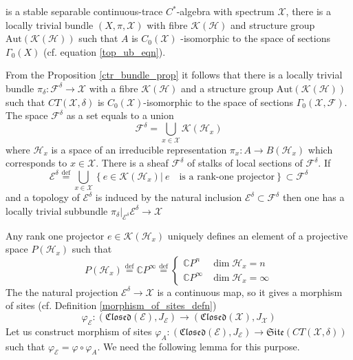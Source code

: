 \documentclass{beamer}
\theoremstyle{plain}
\newcommand{\Ga}{\Gamma}
\newcommand{\C}{\mathbb{C}}
\newcommand{\dl}{\delta}
\newcommand{\Aut}{\mathrm{Aut}}
\newcommand{\K}{\mathcal{K}}
\newcommand{\F}{\mathcal{F}}
\newcommand{\E}{\mathcal{E}}
\newcommand{\sH}{\mathcal{H}}       %
\newcommand{\sX}{\mathcal{X}}       %
\newcommand{\bydef}{\stackrel{\mathrm{def}}{=}}
\begin{document}
\begin{frame}
\begin{lemma}\label{ctr_bundle_prop}\cite{rae:ctr_morita}
	is a stable separable continuous-trace $C^*$-algebra with spectrum $\sX$, there is a locally
	trivial bundle $\left( X, \pi,\sX\right) $ with fibre $\K(\sH)$ and structure group $\Aut \left( \K(\sH)\right)$ such that $A$ is $C_0\left( \sX\right)$ -isomorphic to the space of sections $\Ga_0\left(X \right)$ (cf. equation \eqref{top_ub_eqn}).
	\end{lemma}
		From the Proposition \ref{ctr_bundle_prop}
	it follows that  there is a locally
	trivial bundle $\pi_\dl: \F^\dl\to \sX$ with a fibre $\K(\sH)$ and a structure group $\Aut \left( \K(\sH)\right)$ such that $CT\left(\sX, \dl \right)$ is $C_0\left( \sX\right)$-isomorphic to the space of sections $\Ga_0\left(\sX, \F \right)$. The space $\F^\dl$ as a set equals to a union 
	$$
	\F^\dl = \bigcup_{x\in\sX}\K\left(\sH_x \right) 
	$$
	where $\sH_x$ is a space of an irreducible representation $\pi_x: A \to B\left(\sH_x\right)$ which corresponds to $x \in \sX$. There is a sheaf $\mathscr F^\dl$ of stalks of local sections of $\F^\dl$.
	If
	$$
	\E^\dl  \bydef \bigcup_{x\in\sX} \left\{e \in \K\left(\sH_x \right)| ~ e\quad\text{is a rank-one projector}\right\}\subset \F^\dl
	$$
	and a topology of $\E^\dl$ is induced by the natural inclusion $\E^\dl\subset \F^\dl$ then one has a locally trivial subbundle $\pi_\dl|_{\E^\dl} \E^\dl\to  \sX$
\end{frame}
\begin{frame}
Any rank one projector $e\in  \K\left(\sH_x \right)$ uniquely defines an element of a projective space $P\left(\sH_x \right)$ such that 
$$
P\left(\sH_x \right)\bydef \C P^\infty \bydef \begin{cases}
	\C P^n & \dim \sH_x = n\\
	\C P^\infty & \dim \sH_x = \infty
\end{cases}
$$
The the natural projection $\E^\dl\to \sX$ is a continuous map, so it gives a morphism of sites (cf. Definition \ref{morphism_of_sites_defn})
$$
\varphi_\E : \left(\mathfrak{Closed}\left( \E\right), J_\E\right)\to \left(\mathfrak{Closed}\left( \sX\right), J_\sX\right)
$$
Let us construct morphism of sites $\varphi_A : \left(\mathfrak{Closed}\left( \E\right), J_\E\right)\to \mathfrak{Site}\left( CT\left(\sX, \dl \right) \right)$ such that $\varphi_\E = \varphi \circ \varphi_A$. We need the following lemma for this purpose.
\end{frame}
\end{document}
